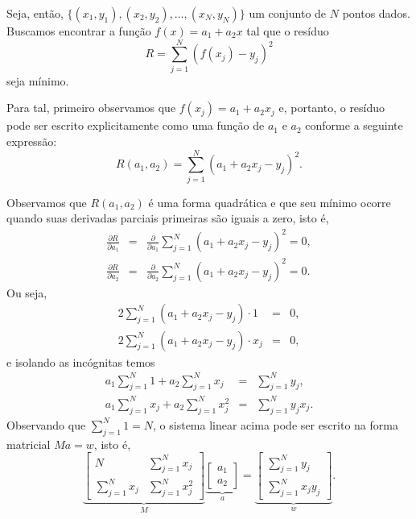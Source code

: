 Seja, então, $\{(x_1,y_1), (x_2,y_2),\ldots, (x_N,y_N)\}$ um conjunto de $N$ pontos dados. Buscamos encontrar a função $f(x) = a_1 + a_2x$ tal que o resíduo
\begin{equation}
  R = \sum_{j=1}^N (f(x_j)-y_j)^2
\end{equation}
seja mínimo.

Para tal, primeiro observamos que $f(x_j)=a_1+a_2 x_j$ e, portanto, o resíduo pode ser escrito explicitamente como uma função de $a_1$ e $a_2$ conforme a seguinte expressão:
\begin{equation}
  R(a_1,a_2) = \sum_{j=1}^N (a_1 + a_2x_j - y_j)^2.
\end{equation}


Observamos que $R(a_1,a_2)$ é uma forma quadrática e que seu mínimo ocorre quando suas derivadas parciais primeiras são iguais a zero, isto é,
\begin{eqnarray*}
  \frac{\partial R}{\partial a_1} &=& \frac{\partial }{\partial a_1} \sum_{j=1}^N (a_1 + a_2 x_j-y_j)^2 =0, \\
  \frac{\partial R}{\partial a_2} &=& \frac{\partial }{\partial a_2} \sum_{j=1}^N (a_1 + a_2 x_j-y_j)^2 =0. 
\end{eqnarray*}
Ou seja,
\begin{eqnarray*}
   2 \sum_{j=1}^N (a_1 + a_2 x_j-y_j)\cdot 1 &=&0, \\
   2 \sum_{j=1}^N (a_1 + a_2 x_j-y_j)\cdot x_j &=&0, 
\end{eqnarray*}
e isolando as incógnitas temos
\begin{eqnarray*}
   a_1\sum_{j=1}^N 1 + a_2 \sum_{j=1}^Nx_j &=&\sum_{j=1}^N y_j,\\
   a_1\sum_{j=1}^N x_j + a_2 \sum_{j=1}^Nx_j^2 &=&\sum_{j=1}^N y_jx_j.
\end{eqnarray*}
Observando que $\sum_{j=1}^N 1=N$, o sistema linear acima pode ser escrito na forma matricial $Ma = w$, isto é,
\begin{equation}\label{eq:smq_reta}
  \underbrace{\begin{bmatrix}
     N &  \sum_{j=1}^N x_j \\
     \sum_{j=1}^N x_j &  \sum_{j=1}^N x_j^2 
  \end{bmatrix}}_{M}
  \underbrace{\begin{bmatrix}
     a_1 \\
     a_2 
  \end{bmatrix}}_{a} =
  \underbrace{\begin{bmatrix}
     \sum_{j=1}^N y_j \\
     \sum_{j=1}^N x_j y_j 
  \end{bmatrix}}_{w}.
\end{equation}

